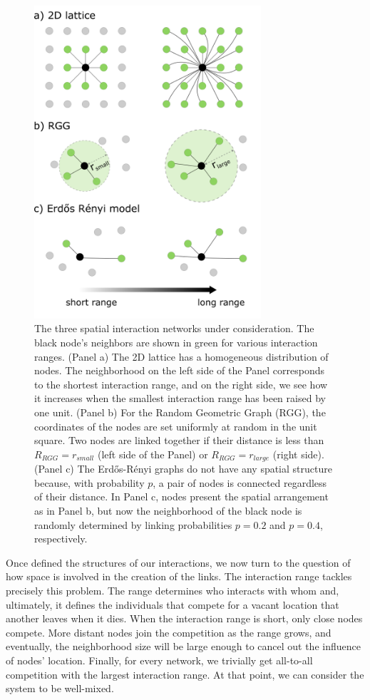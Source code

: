 \begin{figure}[htbp]
 \centering
 \includegraphics[width =0.75\textwidth]{figures/chp1/fig1.png}
 \caption[Spatial interaction networks]{The three spatial interaction networks under consideration. The black node's neighbors are shown in green for various interaction ranges. (Panel a) The 2D lattice has a homogeneous distribution of nodes. The neighborhood on the left side of the Panel corresponds to the shortest interaction range, and on the right side, we see how it increases when the smallest interaction range has been raised by one unit. (Panel b) For the Random Geometric Graph (RGG), the coordinates of the nodes are set uniformly
 at random in the unit square. Two nodes are linked together if their
 distance is less than $R_{RGG} = r_{small}$ (left side of the Panel)
 or $R_{RGG} = r_{large}$ (right side). (Panel c) The Erd{\H{o}}s-R{\'e}nyi
 graphs do not have any spatial structure because, with probability
 $p$, a pair of nodes is connected regardless of their distance. In Panel c, nodes present the spatial arrangement as in Panel b, but now the neighborhood
 of the black node is randomly determined by linking probabilities
 $p = 0.2$ and $p = 0.4$, respectively.
}
 \label{chp1:fig:2}
\end{figure}
Once defined the structures of our interactions, we now turn to the question of how space is involved in the creation of the links. The interaction range tackles precisely this problem. The range determines who interacts with whom and, ultimately, it defines the individuals that compete for a vacant location that another leaves when it dies. When the interaction range is short, only close nodes compete. More distant nodes join the competition as the range grows, and eventually, the neighborhood size will be large enough to cancel out the influence of nodes' location. Finally, for every network, we trivially get all-to-all competition with the largest interaction range. At that point, we can consider the system to be well-mixed. \\

